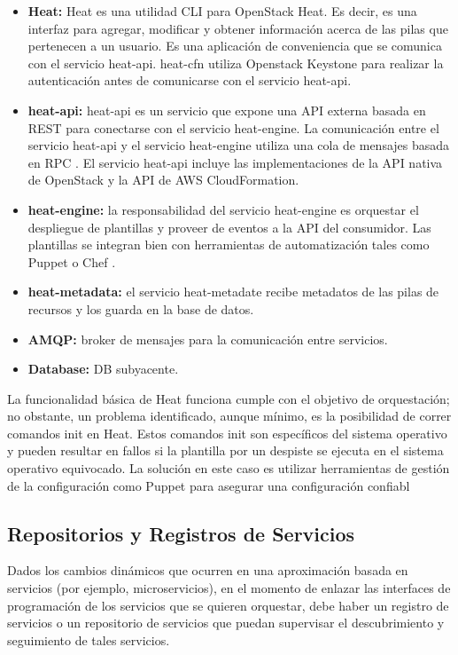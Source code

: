 \begin{itemize}
\item \textbf{Heat:} Heat es una utilidad CLI para OpenStack Heat. Es decir, es una interfaz para agregar, modificar y obtener información acerca de las pilas que pertenecen a un usuario. Es una aplicación de conveniencia que se comunica con el servicio heat-api. heat-cfn utiliza Openstack Keystone para realizar la autenticación antes de comunicarse con el servicio heat-api.
\item \textbf{heat-api:} heat-api es un servicio que expone una API externa basada en REST \cite{Richardson2008-ng} para conectarse con el servicio heat-engine. La comunicación entre el servicio heat-api y el servicio heat-engine utiliza una cola de mensajes basada en RPC \cite{Arpaci-Dusseau2015-px}. El servicio heat-api incluye las implementaciones de la API nativa de OpenStack y la API de AWS CloudFormation.
\item \textbf{heat-engine:} la responsabilidad del servicio heat-engine es orquestar el despliegue de plantillas y proveer de eventos a la API del consumidor. Las plantillas se integran bien con herramientas de automatización tales como Puppet \cite{Puppet2016-ao} o Chef \cite{Chef2016-cc}.
\item \textbf{heat-metadata:} el servicio heat-metadate recibe metadatos de las pilas de recursos y los guarda en la base de datos.
\item \textbf{AMQP:} broker de mensajes para la comunicación entre servicios.
\item \textbf{Database:} DB subyacente.
\end{itemize}

La funcionalidad básica de Heat funciona cumple con el objetivo de orquestación; no obstante, un problema identificado, aunque mínimo, es la posibilidad de correr comandos init en Heat. Estos comandos init son específicos del sistema operativo y pueden resultar en fallos si la plantilla por un despiste se ejecuta en el sistema operativo equivocado. La solución en este caso es utilizar herramientas de gestión de la configuración como Puppet para asegurar una configuración confiabl

\subsection{Repositorios y Registros de Servicios}
Dados los cambios dinámicos que ocurren en una aproximación basada en servicios (por ejemplo, microservicios), en el momento de enlazar las interfaces de programación de los servicios que se quieren orquestar, debe haber un registro de servicios o un repositorio de servicios que puedan supervisar el descubrimiento y seguimiento de tales servicios.

